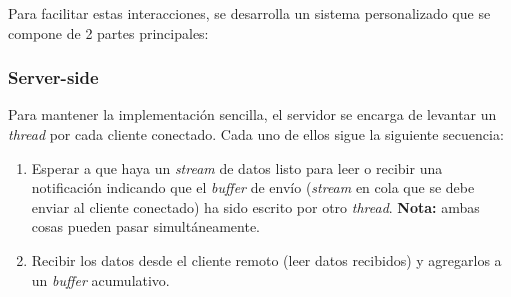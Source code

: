 Para facilitar estas interacciones, se desarrolla un sistema personalizado que se compone de 2 partes principales:

\subsubsection*{Server-side}
Para mantener la implementación sencilla, el servidor se encarga de levantar un \emph{thread} por cada cliente conectado. Cada uno de ellos sigue la siguiente secuencia:

\begin{enumerate}
	\item Esperar a que haya un \emph{stream} de datos listo para leer o recibir una notificación indicando que el \emph{buffer} de envío (\emph{stream} en cola que se debe enviar al cliente conectado) ha sido escrito por otro \emph{thread}. \textbf{Nota:} ambas cosas pueden pasar simultáneamente.
	\item Recibir los datos desde el cliente remoto (leer datos recibidos) y agregarlos a un \emph{buffer} acumulativo.
\end{enumerate}